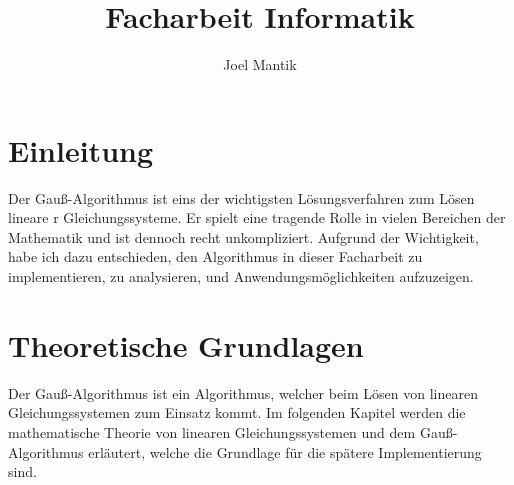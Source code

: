 \documentclass[a4paper, 12pt]{report}
\title{Facharbeit Informatik}
\author{Joel Mantik}
\begin{document}
\maketitle
\begin{sloppypar}
\tableofcontents

\chapter{Einleitung}
Der Gauß-Algorithmus ist eins der wichtigsten Lösungsverfahren zum Lösen lineare
r Gleichungssysteme.
Er spielt eine tragende Rolle in vielen Bereichen der Mathematik und ist dennoch  recht unkompliziert.
Aufgrund der Wichtigkeit, habe ich dazu entschieden, den Algorithmus in dieser
Facharbeit zu implementieren,
zu analysieren, und Anwendungsmöglichkeiten aufzuzeigen.

\chapter{Theoretische Grundlagen}
Der Gauß-Algorithmus ist ein Algorithmus, welcher beim Lösen von linearen Gleichungssystemen zum Einsatz kommt. Im folgenden Kapitel werden die mathematische Theorie
von linearen Gleichungssystemen und dem Gauß-Algorithmus erläutert, welche die Grundlage für die spätere Implementierung sind.

\end{sloppypar}
\end{document}
